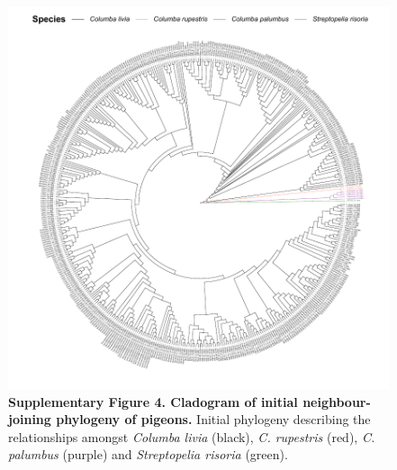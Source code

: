 \documentclass[twoside, british, a4paper]{article}
\begin{document}
\begin{figure}
\centering
\includegraphics[width=1\textwidth]{../FPG--Pipeline/FPG--Plots/FPG--Phylogenies/FPG--Phylogeny--Dataset_I.pdf}
\captionsetup{labelformat=empty}
\caption[Supplementary Figure 4. Cladogram of initial neighbour-joining phylogeny of pigeons.]{\textbf{Supplementary Figure 4. Cladogram of initial neighbour-joining phylogeny of pigeons.} Initial phylogeny describing the relationships amongst \textit{Columba livia} (black), \textit{C. rupestris} (red), \textit{C. palumbus} (purple) and \textit{Streptopelia risoria} (green).}
\label{SI:FPG--Phylogeny--Dataset_I}
\end{figure}
\end{document}
